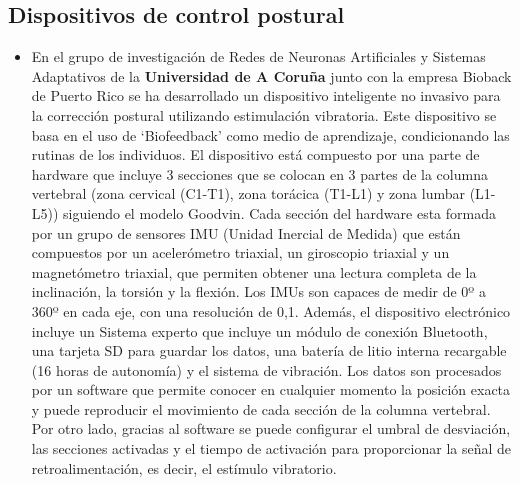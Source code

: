 \subsection{Dispositivos de control postural} 
\begin{itemize}
    \item En el grupo de investigación de Redes de Neuronas Artificiales y Sistemas Adaptativos de la \textbf{Universidad de A Coruña} junto con la empresa Bioback de Puerto Rico se ha desarrollado un dispositivo inteligente no invasivo para la corrección postural utilizando estimulación vibratoria\cite{dispositivoUAC}. Este dispositivo se basa en el uso de ‘Biofeedback’ como medio de aprendizaje, condicionando las rutinas de los individuos.  \newline El dispositivo está compuesto por una parte de hardware que incluye 3 secciones que se colocan en 3 partes de la columna vertebral (zona cervical (C1-T1), zona torácica (T1-L1) y zona lumbar (L1-L5)) siguiendo el modelo Goodvin. Cada sección del hardware esta formada por un grupo de sensores IMU (Unidad Inercial de Medida) que están compuestos por un acelerómetro triaxial, un giroscopio triaxial y un magnetómetro triaxial, que permiten obtener una lectura completa de la inclinación, la torsión y la flexión. Los IMUs son capaces de medir de 0º a 360º en cada eje, con una resolución de 0,1. Además, el dispositivo electrónico incluye un Sistema experto que incluye un módulo de conexión Bluetooth, una tarjeta SD para guardar los datos, una batería de litio interna recargable (16 horas de autonomía) y el sistema de vibración.  \newline Los datos son procesados por un software que permite conocer en cualquier momento la posición exacta y puede reproducir el movimiento de cada sección de la columna vertebral. Por otro lado, gracias al software se puede configurar el umbral de desviación, las secciones activadas y el tiempo de activación para proporcionar la señal de retroalimentación, es decir, el estímulo vibratorio. 



\end{itemize}
